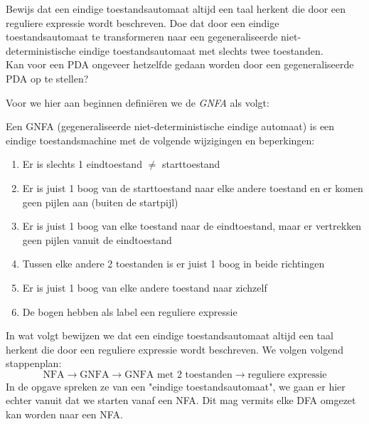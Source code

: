 \begin{question}
Bewijs dat een eindige toestandsautomaat altijd een taal herkent die door een reguliere expressie wordt beschreven. Doe dat door een eindige toestandsautomaat te transformeren naar een gegeneraliseerde niet-deterministische eindige toestandsautomaat met slechts twee toestanden.\\
Kan voor een PDA ongeveer hetzelfde gedaan worden door een gegeneraliseerde PDA op te stellen?\\
\end{question}

Voor we hier aan beginnen defini\"eren we de \emph{GNFA} als volgt:
\begin{theorem}[GNFA]
Een GNFA (gegeneraliseerde niet-deterministische eindige automaat) is een eindige toestandsmachine met de volgende wijzigingen en beperkingen:
\begin{enumerate}
\item Er is slechts 1 eindtoestand $\neq$ starttoestand
\item Er is juist 1 boog van de starttoestand naar elke andere toestand en er komen geen pijlen aan (buiten de startpijl)
\item Er is juist 1 boog van elke toestand naar de eindtoestand, maar er vertrekken geen pijlen vanuit de eindtoestand
\item Tussen elke andere 2 toestanden is er juist 1 boog in beide richtingen
\item Er is juist 1 boog van elke andere toestand naar zichzelf
\item De bogen hebben als label een reguliere expressie
\end{enumerate}
\end{theorem}
In wat volgt bewijzen we dat een eindige toestandsautomaat altijd een taal herkent die door een reguliere expressie wordt beschreven. We volgen volgend stappenplan:
$$ \text{NFA} \rightarrow \text{GNFA} \rightarrow \text{GNFA met 2 toestanden} \rightarrow \text{reguliere expressie} $$
In de opgave spreken ze van een "eindige toestandsautomaat", we gaan er hier echter vanuit dat we starten vanaf een NFA. Dit mag vermits elke DFA omgezet kan worden naar een NFA.

